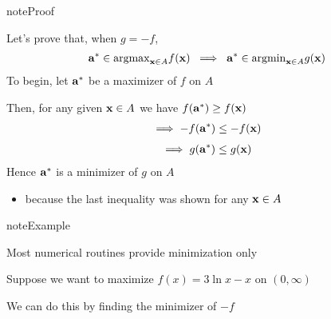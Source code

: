 \documentclass[letterpaper,10pt,english]{jupyterBook}
\begin{document}
\begin{figure}[htbp]
\centering

\noindent{}
\end{figure}

\begin{sphinxadmonition}{note}{Proof}

\sphinxAtStartPar
Let’s prove that, when \(g = -f\),
\begin{equation*}
\begin{split}
%
{\bf a}^* \in \mathrm{argmax}_{{\bf x} \in A}f({\bf x})
\; \implies \;
{\bf a}^* \in \mathrm{argmin}_{{\bf x} \in A}g({\bf x})
%
\end{split}
\end{equation*}
\sphinxAtStartPar
To begin, let \({\bf a}^*\) be a maximizer of \(f\) on \(A\)

\sphinxAtStartPar
Then, for any given \({\bf x} \in A\) we have \(f({\bf a}^*) \geq f({\bf x})\)
\begin{equation*}
\begin{split}
%
\implies
-f({\bf a}^*) \leq -f({\bf x})
%
\end{split}
\end{equation*}\begin{equation*}
\begin{split}
%
\implies
g({\bf a}^*) \leq g({\bf x})
%
\end{split}
\end{equation*}
\sphinxAtStartPar
Hence \({\bf a}^*\) is a minimizer of \(g\) on \(A\)
\begin{itemize}
\item {} 
\sphinxAtStartPar
because the last inequality was shown for any \({\bf x} \in A\)

\end{itemize}
\end{sphinxadmonition}

\begin{sphinxadmonition}{note}{Example}

\sphinxAtStartPar
Most numerical routines provide minimization only

\sphinxAtStartPar
Suppose we want to maximize \(f(x) = 3 \ln x - x\) on \((0, \infty)\)

\sphinxAtStartPar
We can do this by finding the minimizer of \(-f\)
\end{sphinxadmonition}
\end{document}
